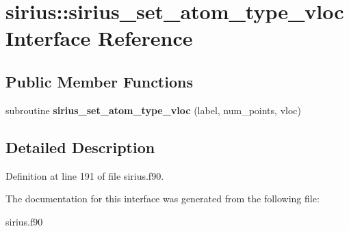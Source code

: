 \hypertarget{interfacesirius_1_1sirius__set__atom__type__vloc}{}\section{sirius\+:\+:sirius\+\_\+set\+\_\+atom\+\_\+type\+\_\+vloc Interface Reference}
\label{interfacesirius_1_1sirius__set__atom__type__vloc}
\subsection*{Public Member Functions}
\begin{DoxyCompactItemize}
\item 
\hypertarget{interfacesirius_1_1sirius__set__atom__type__vloc_a5bcccdfdb7838b1dfada189f23b12f10}{}subroutine {\bfseries sirius\+\_\+set\+\_\+atom\+\_\+type\+\_\+vloc} (label, num\+\_\+points, vloc)\label{interfacesirius_1_1sirius__set__atom__type__vloc_a5bcccdfdb7838b1dfada189f23b12f10}

\end{DoxyCompactItemize}


\subsection{Detailed Description}


Definition at line 191 of file sirius.\+f90.



The documentation for this interface was generated from the following file\+:\begin{DoxyCompactItemize}
\item 
sirius.\+f90\end{DoxyCompactItemize}
